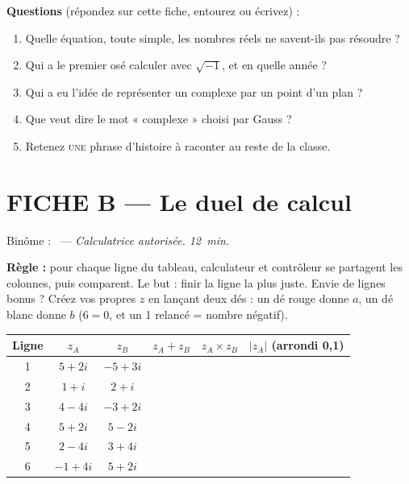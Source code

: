 \documentclass[11pt,a4paper]{article}
\newcommand{\pointilles}{\makebox[3.5cm]{\dotfill}}
\begin{document}
\textbf{Questions} (répondez sur cette fiche, entourez ou écrivez) :
\begin{enumerate}
  \item Quelle équation, toute simple, les nombres réels ne savent-ils pas
        résoudre ?
  \item Qui a le premier osé calculer avec $\sqrt{-1}$, et en quelle année ?
  \item Qui a eu l'idée de représenter un complexe par un point d'un plan ?
  \item Que veut dire le mot « complexe » choisi par Gauss ?
  \item Retenez \textsc{une} phrase d'histoire à raconter au reste de la
        classe.
\end{enumerate}

\newpage
\section*{FICHE B --- Le duel de calcul}

Binôme : \pointilles\ --- \emph{Calculatrice autorisée. 12~min.}

\textbf{Règle :} pour chaque ligne du tableau, calculateur et contrôleur se
partagent les colonnes, puis comparent. Le but : finir la ligne la plus juste.
Envie de lignes bonus ? Créez vos propres $z$ en lançant deux dés : un dé rouge
donne $a$, un dé blanc donne $b$ ($6 = 0$, et un 1 relancé = nombre négatif).

\begin{center}
\begin{tabular}{|c|c|c|c|c|c|}
  \hline
  \textbf{Ligne} & $z_A$ & $z_B$ & $z_A + z_B$ & $z_A \times z_B$
  & $|z_A|$ (arrondi 0,1) \\ \hline
  1 & $5 + 2i$ & $-5 + 3i$ & & & \\ \hline
  2 & $1 + i$  & $2 + i$   & & & \\ \hline
  3 & $4 - 4i$ & $-3 + 2i$& & & \\ \hline
  4 & $5 + 2i$ & $5 - 2i$ & & & \\ \hline
  5 & $2 - 4i$ & $3 + 4i$ & & & \\ \hline
  6 & $-1 + 4i$& $5 + 2i$ & & & \\ \hline
\end{tabular}
\end{center}
\end{document}

